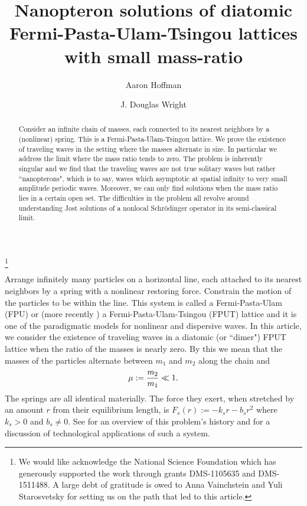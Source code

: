 \documentclass[12pt]{amsart}
\title[Nanopteron solutions of FPUT]{Nanopteron solutions of diatomic Fermi-Pasta-Ulam-Tsingou lattices with small mass-ratio}
\author{Aaron Hoffman}\address{Drexel University, Philadelphia PA, \tt{jdoug@math.drexel.edu}}
\author{J. Douglas Wright}\address{Olin College of Engineering, Needham MA, \tt{aaron.hoffman@olin.edu}}
\numberwithin{equation}{section}
\begin{document}
\thanks{
We would like acknowledge the National Science Foundation which has generously supported
the work through grants DMS-1105635 and DMS-1511488.  A large debt of gratitude is owed to Anna Vainchstein and Yuli Starosvetsky 
for setting us on the path that led to this article.
}

\begin{abstract}
Consider an infinite chain of masses, each connected to its nearest neighbors by a (nonlinear) spring. This is a Fermi-Pasta-Ulam-Tsingou lattice. 
We prove the existence of traveling waves in the setting where the masses alternate in size. In particular we address the limit where the mass ratio tends to zero. The problem is inherently singular and we find that the traveling waves are not true solitary waves but rather ``nanopterons", which is to say, waves which asymptotic at spatial infinity to very small amplitude periodic waves. Moreover, we can only find solutions when the mass ratio lies in a certain open set. The difficulties in the problem all revolve around understanding Jost solutions of a nonlocal Schr\"odinger operator in its semi-classical limit. 
\end{abstract}

\maketitle


{Arrange infinitely many particles on a horizontal line, each attached to its nearest neighbors
by a spring with a nonlinear restoring force. Constrain the motion of the particles to be within the line.
This system is called a Fermi-Pasta-Ulam (FPU) or (more recently \cite{dauxois}) a
Fermi-Pasta-Ulam-Tsingou (FPUT) lattice and it is one of the paradigmatic models
for nonlinear and dispersive waves. %
In this article, we consider the existence of traveling waves in a diatomic (or ``dimer") FPUT lattice
when the ratio of the masses is nearly zero. By this we mean that
the masses of the particles alternate between $m_1$ and $m_2$ along the chain and 
$$
\mu:= {m_2 \over m_1} \ll 1.
$$
The springs are all identical materially. The force they exert, when stretched by an amount $r$ from their equilibrium
length, is 
$
F_s( r ) := - k_s r - b_s r^2
$
where $k_s > 0$ and $b_s \ne 0$.
See \cite{brillouin} for an overview of this problem's history and \cite{porter2} for a discussion of technological
applications of such a system.
}
\end{document}
